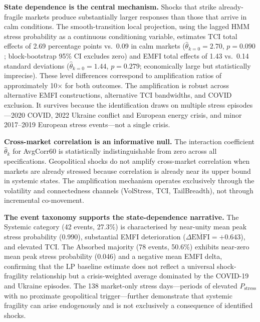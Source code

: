 \documentclass[11pt]{article}
\begin{document}
\textbf{State dependence is the central mechanism.} Shocks that strike
already-fragile markets produce substantially larger responses than those
that arrive in calm conditions. The smooth-transition local projection, using
the lagged HMM stress probability as a continuous conditioning variable,
estimates TCI total effects of 2.69 percentage points vs.\ 0.09 in calm
markets ($\hat\theta_{k=0} = 2.70$, $p = 0.090$; block-bootstrap 95\% CI
excludes zero) and EMFI total effects of 1.43 vs.\ 0.14 standard
deviations ($\hat\theta_{k=0} = 1.44$, $p = 0.279$; economically large
but statistically imprecise). These level differences correspond to
amplification ratios of approximately 10$\times$ for both outcomes.
The amplification is robust across alternative EMFI constructions, alternative
TCI bandwidths, and COVID exclusion. It survives because the identification draws
on multiple stress episodes---2020 COVID, 2022 Ukraine conflict and European
energy crisis, and minor 2017--2019 European stress events---not a single crisis.

\textbf{Cross-market correlation is an informative null.} The interaction
coefficient $\hat\theta_k$ for AvgCorr60 is statistically indistinguishable from
zero across all specifications. Geopolitical shocks do not amplify cross-market
correlation when markets are already stressed because correlation is already near
its upper bound in systemic states. The amplification mechanism operates
exclusively through the volatility and connectedness channels (VolStress, TCI,
TailBreadth), not through incremental co-movement.

\textbf{The event taxonomy supports the state-dependence narrative.}
The Systemic category (42 events, 27.3\%) is characterised by near-unity mean
peak stress probability (0.990), substantial EMFI deterioration ($\Delta\overline{\text{EMFI}} = +0.643$),
and elevated TCI. The Absorbed majority (78 events, 50.6\%) exhibits near-zero
mean peak stress probability (0.046) and a negative mean EMFI delta, confirming
that the LP baseline estimate does not reflect a universal shock-fragility
relationship but a crisis-weighted average dominated by the COVID-19 and Ukraine
episodes. The 138 market-only stress days---periods of elevated $P_{\text{stress}}$
with no proximate geopolitical trigger---further demonstrate that systemic fragility
can arise endogenously and is not exclusively a consequence of identified shocks.
\end{document}
